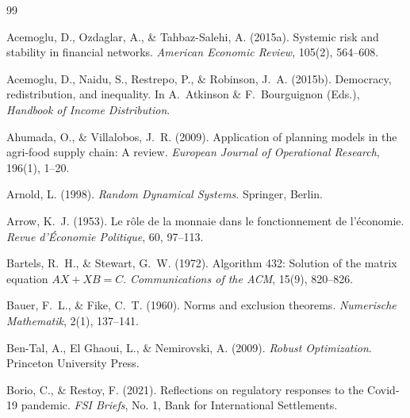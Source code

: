 \documentclass[a4paper, 12pt, twoside, openright]{report}
\theoremstyle{definition}
\theoremstyle{definition}
\begin{document}
\cleardoublepage



\begin{thebibliography}{99}

Acemoglu, D., Ozdaglar, A., \& Tahbaz-Salehi, A. (2015a).
\newblock Systemic risk and stability in financial networks.
\newblock \emph{American Economic Review}, 105(2), 564--608.

Acemoglu, D., Naidu, S., Restrepo, P., \& Robinson, J.~A. (2015b).
\newblock Democracy, redistribution, and inequality.
\newblock In A.~Atkinson \& F.~Bourguignon (Eds.), \emph{Handbook of Income Distribution}.

Ahumada, O., \& Villalobos, J.~R. (2009).
\newblock Application of planning models in the agri-food supply chain: A review.
\newblock \emph{European Journal of Operational Research}, 196(1), 1--20.

Arnold, L. (1998).
\newblock \emph{Random Dynamical Systems}.
\newblock Springer, Berlin.

Arrow, K.~J. (1953).
\newblock Le r{\^o}le de la monnaie dans le fonctionnement de l'{\'e}conomie.
\newblock \emph{Revue d'{\'E}conomie Politique}, 60, 97--113.

Bartels, R.~H., \& Stewart, G.~W. (1972).
\newblock Algorithm 432: Solution of the matrix equation $AX + XB = C$.
\newblock \emph{Communications of the ACM}, 15(9), 820--826.

Bauer, F.~L., \& Fike, C.~T. (1960).
\newblock Norms and exclusion theorems.
\newblock \emph{Numerische Mathematik}, 2(1), 137--141.

Ben-Tal, A., El Ghaoui, L., \& Nemirovski, A. (2009).
\newblock \emph{Robust Optimization}.
\newblock Princeton University Press.

Borio, C., \& Restoy, F. (2021).
\newblock Reflections on regulatory responses to the Covid-19 pandemic.
\newblock \emph{FSI Briefs}, No. 1, Bank for International Settlements.


\end{thebibliography}
\end{document}
